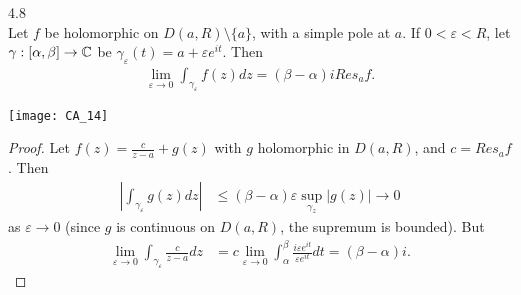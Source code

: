 \documentclass[a4paper]{article}
\begin{document}
\begin{lemma} 4.8\\
Let $f$ be holomorphic on $D(a,R) \setminus \{a\}$, with a simple pole at $a$. If $0<\varepsilon<R$, let $\gamma:[\alpha,\beta] \to \mathbb{C}$ be $\gamma_\varepsilon(t) = a+\varepsilon e^{it}$. Then
\begin{equation*}
\begin{aligned}
\lim_{\varepsilon \to 0} \int_{\gamma_\varepsilon} f(z) dz = (\beta-\alpha) i Res_a f.
\end{aligned}
\end{equation*}

\texttt{[image: CA\_14]}

\begin{proof}
Let $f(z) = \frac{c}{z-a} + g(z)$ with $g$ holomorphic in $D(a,R)$, and $c=Res_a f$. Then
\begin{equation*}
\begin{aligned}
\left|\int_{\gamma_\varepsilon} g(z) dz\right| &\leq (\beta-\alpha)\varepsilon \sup_{\gamma_z} |g(z)| \to 0
\end{aligned}
\end{equation*}
as $\varepsilon \to 0$ (since $g$ is continuous on $D(a,R)$, the supremum is bounded). But
\begin{equation*}
\begin{aligned}
\lim_{\varepsilon \to 0} \int_{\gamma_\varepsilon} \frac{c}{z-a} dz &=c \lim_{\varepsilon \to 0} \int_\alpha^\beta \frac{i\varepsilon e^{it}}{\varepsilon e^{it}} dt = (\beta-\alpha)i.
\end{aligned}
\end{equation*}
\end{proof}
\end{lemma}
\end{document}
